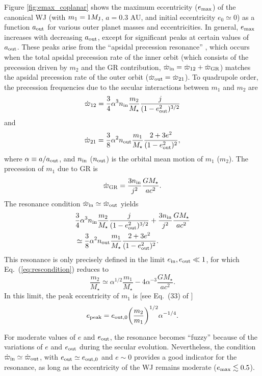 \documentclass[12pt,useAMS, usenatbib]{mn2e}
\newcommand{\be}{\begin{equation}}
\newcommand{\ee}{\end{equation}}
\newcommand{\Max}{{\rm max}}
\newcommand{\In}{{\rm in}}
\newcommand{\Out}{{\rm out}}
\newcommand{\ein}{e_\In}
\newcommand{\aout}{a_\Out}
\newcommand{\eout}{e_\Out}
\newcommand{\emax}{e_\Max}
\newcommand{\gr}{\rm GR}
\newcommand{\mjup}{M_{\rm J}}
\begin{document}
Figure \ref{fig:emax_coplanar} shows the maximum eccentricity ($\emax$) of the canonical WJ (with $m_1 = 1 \mjup$, $a=0.3$ AU, and initial eccentricity $e_0\simeq 0$) as a function $\aout$ for various outer planet masses and eccentricities.  In general, $\emax$ increases with decreasing $\aout$, except for significant peaks at certain values of $\aout$.  These peaks arise from the ``apsidal precession resonance'' \citep{liu2015b}, which occurs when the total apsidal precession rate of the inner orbit (which consists of the precession driven by $m_2$ and the GR contribution, $\dot{\varpi}_\In = \dot{\varpi}_{12} + \dot{\varpi}_{\gr}$) matches the apsidal precession rate of the outer orbit ($\dot{\varpi}_\Out = \dot{\varpi}_{21}$).  To quadrupole order, the precession frequencies due to the secular interactions between $m_1$ and $m_2$ are 
\be
\dot{\varpi}_{12} = \frac{3}{4} \alpha^3 n_\In \frac{m_2}{M_\star} \frac{j}{(1 - \eout^2)^{3/2}}
\label{eq:dot_pomega_in}
\ee
and
\be
\dot{\varpi}_{21}  = \frac{3}{8} \alpha^2 n_\Out \frac{m_1}{M_\star} \frac{2 + 3 e^2}{(1 - \eout^2)^{2}}, 
\ee
where $\alpha \equiv a / \aout$, and $n_{\In}$ ($n_{\Out}$) is the orbital mean motion of $m_1$ ($m_2$).  The precession of $m_1$ due to GR is
\be
\dot{\varpi}_{\gr} = \frac{3 n_\In}{j^2} \frac{G M_\star}{a c^2}.
\label{eq:gr}
\ee
The resonance condition $\dot{\varpi}_\In \simeq \dot{\varpi}_\Out$ yields
\be
\begin{split}
& \frac{3}{4} \alpha^3 n_\In \frac{m_2}{M_\star} \frac{j}{(1 - \eout^2)^{3/2}} + \frac{3 n_\In}{j^2} \frac{G M_\star}{a c^2} \\ 
& \simeq \frac{3}{8} \alpha^2 n_\Out \frac{m_1}{M_\star} \frac{2 + 3 e^2}{(1 - \eout^2)^2}.
\label{eq:rescondition}
\end{split}
\ee  
This resonance is only precisely defined in the limit $\ein,\eout \ll 1$, for which Eq.~(\ref{eq:rescondition}) reduces to
\be
\frac{m_2}{M_\star} \simeq \alpha^{1/2} \frac{m_1}{M_\star} - 4 \alpha^{-3} \frac{G M_\star}{a c^2}.
\label{eq:res_low_e}
\ee
In this limit, the peak eccentricity of $m_1$ is [see Eq.~(33) of \citep{liu2015b}]
\be
e_{\rm peak} = e_{\Out,0} \bigg( \frac{m_2}{m_1} \bigg)^{1/2} \alpha^{-1/4}.
\label{eq:epeak}
\ee

For moderate values of $e$ and $\eout$, the resonance becomes ``fuzzy''
because of the variations of $e$ and $\eout$ during the secular evolution.  Nevertheless, the condition $\dot{\varpi}_{\In} \simeq \dot{\varpi}_{\Out}$, with $\eout \simeq e_{\Out,0}$ and $e \sim 0$ provides a good indicator for the resonance, as long as the eccentricity of the WJ remains moderate ($\emax \lesssim 0.5$).
\end{document}
